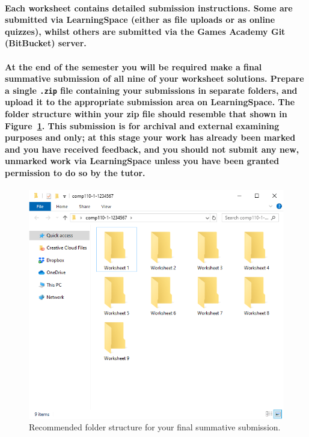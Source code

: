 \documentclass{../../fal_assignment}
\begin{document}
\paragraph{Each worksheet contains detailed submission instructions. 
	Some are submitted via \textbf{LearningSpace} (either as \textbf{file uploads} or as \textbf{online quizzes}),
	whilst others are submitted via the Games Academy \textbf{Git (BitBucket)} server.}

\paragraph{At the end of the semester you will be required make a final summative submission of all nine of your worksheet solutions.
Prepare a \textbf{single \texttt{.zip} file} containing your submissions \textbf{in separate folders}, and upload it to the appropriate submission area on LearningSpace. The folder structure within your zip file should resemble that shown in Figure~\ref{fig:folder_structure}.
This submission is for archival and external examining purposes and only; at this stage your work has already been marked and you have received feedback, and you should \textbf{not} submit any new, unmarked work via LearningSpace unless you have been granted permission to do so by the tutor.}
\begin{figure}
    \begin{center}
        \includegraphics[height=0.4\textheight]{folder_structure}
    \end{center}
    \caption{Recommended folder structure for your final summative submission.}
    \label{fig:folder_structure}
\end{figure}
\end{document}
